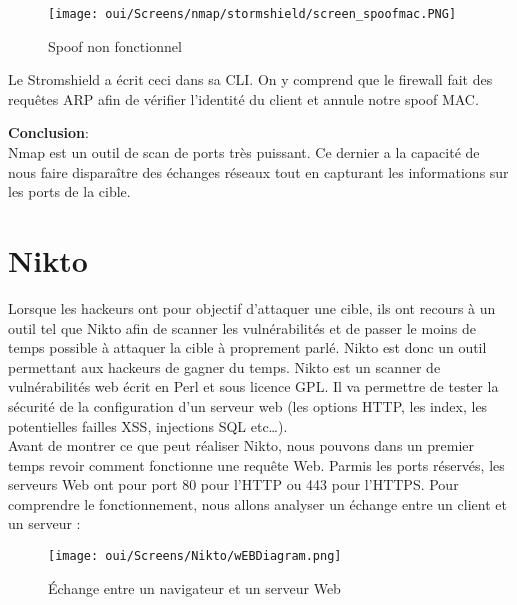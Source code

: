 \begin{figure}[htp!]
  \centering
  \setlength\figureheight{7cm}
  \setlength\figurewidth{9cm}
  \texttt{[image: oui/Screens/nmap/stormshield/screen\_spoofmac.PNG]}
  \caption{Spoof non fonctionnel}
  \label{fig:courbe-tikz}
\end{figure}

\newpage
Le Stromshield a écrit ceci dans sa CLI. On y comprend que le firewall fait des requêtes ARP afin de vérifier l'identité du client et annule notre spoof MAC.

\textbf{Conclusion}:\\
Nmap est un outil de scan de ports très puissant. Ce dernier a la capacité de nous faire disparaître des échanges réseaux tout en capturant les informations sur les ports de la cible.

\section{Nikto}

Lorsque les hackeurs ont pour objectif d’attaquer une cible, ils ont recours à un outil tel que Nikto afin de scanner les vulnérabilités et de passer le moins de temps possible à attaquer la cible à proprement parlé. Nikto est donc un outil permettant aux hackeurs de gagner du temps.
Nikto est un scanner de vulnérabilités web écrit en Perl et sous licence GPL. Il va permettre de tester la sécurité de la configuration d'un serveur web (les options HTTP, les index, les potentielles failles XSS, injections SQL etc…).\\
Avant de montrer ce que peut réaliser Nikto, nous pouvons dans un premier temps revoir comment fonctionne une requête Web. Parmis les ports réservés, les serveurs Web ont pour port 80 pour l'HTTP ou 443 pour l'HTTPS. Pour comprendre le fonctionnement, nous allons analyser un échange entre un client et un serveur :

\begin{figure}[htp!]
  \centering
  \setlength\figureheight{7cm}
  \setlength\figurewidth{9cm}
  \texttt{[image: oui/Screens/Nikto/wEBDiagram.png]}
  \caption{Échange entre un navigateur et un serveur Web}
  \label{fig:courbe-tikz}
\end{figure}

